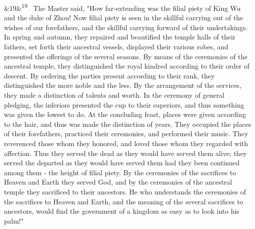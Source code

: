 \documentclass[12pt]{article}
\newcommand{\para}[1][]{\par\noindent\ifx&#1&\else\textsuperscript{\footnotesize #1}~\fi}
\begin{document}
\para[19] The Master said, "How far-extending was the filial piety of King Wu and the duke of Zhou! Now filial piety is seen in the skillful carrying out of the wishes of our forefathers, and the skillful carrying forward of their undertakings. In spring and autumn, they repaired and beautified the temple halls of their fathers, set forth their ancestral vessels, displayed their various robes, and presented the offerings of the several seasons. By means of the ceremonies of the ancestral temple, they distinguished the royal kindred according to their order of descent. By ordering the parties present according to their rank, they distinguished the more noble and the less. By the arrangement of the services, they made a distinction of talents and worth. In the ceremony of general pledging, the inferiors presented the cup to their superiors, and thus something was given the lowest to do. At the concluding feast, places were given according to the hair, and thus was made the distinction of years. They occupied the places of their forefathers, practiced their ceremonies, and performed their music. They reverenced those whom they honored, and loved those whom they regarded with affection. Thus they served the dead as they would have served them alive; they served the departed as they would have served them had they been continued among them - the height of filial piety. By the ceremonies of the sacrifices to Heaven and Earth they served God, and by the ceremonies of the ancestral temple they sacrificed to their ancestors. He who understands the ceremonies of the sacrifices to Heaven and Earth, and the meaning of the several sacrifices to ancestors, would find the government of a kingdom as easy as to look into his palm!"
\end{document}
